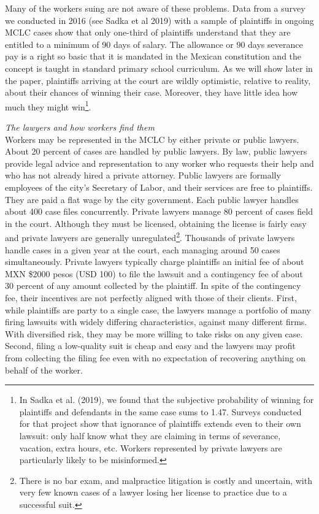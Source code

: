 \documentclass[12 pt]{article}
\begin{document}
Many of the workers suing are not aware of these problems. Data from a survey we conducted in 2016 (see Sadka et al 2019) with a sample of plaintiffs in ongoing MCLC cases show that only one-third of plaintiffs understand that they are entitled to a minimum of 90 days of salary. The allowance or 90 days severance pay is a right so basic that it is mandated in the Mexican constitution and the concept is taught in standard primary school curriculum. As we will show later in the paper, plaintiffs arriving at the court are wildly optimistic, relative to reality, about their chances of winning their case. Moreover, they have little idea how much they might win\footnote{In Sadka et al. (2019), we found that the subjective probability of winning for plaintiffs and defendants in the same case sums to 1.47. Surveys conducted for that project show that ignorance of plaintiffs extends even to their own lawsuit: only half know what they are claiming in terms of severance, vacation, extra hours, etc. Workers represented by private lawyers are particularly likely to be misinformed.}.

\emph{The lawyers and how workers find them}\\
Workers may be represented in the MCLC by either private or public lawyers. About 20 percent of cases are handled by public lawyers. By law, public lawyers provide legal advice and representation to any worker who requests their help and who has not already hired a private attorney. Public lawyers are formally employees of the city’s Secretary of Labor, and their services are free to plaintiffs. They are paid a flat wage by the city government. Each public lawyer handles about 400 case files concurrently. Private lawyers manage 80 percent of cases field in the court. Although they must be licensed, obtaining the license is fairly easy and private lawyers are generally unregulated\footnote{There is no bar exam, and malpractice litigation is costly and uncertain, with very few known cases of a lawyer losing her license to practice due to a successful suit.}.  Thousands of private lawyers handle cases in a given year at the court, each managing around 50 cases simultaneously. Private lawyers typically charge plaintiffs an initial fee of about MXN \$2000 pesos (USD 100) to file the lawsuit and a contingency fee of about 30 percent of any amount collected by the plaintiff. In spite of the contingency fee, their incentives are not perfectly aligned with those of their clients. First, while plaintiffs are party to a single case, the lawyers manage a portfolio of many firing lawsuits with widely differing characteristics, against many different firms. With diversified risk, they may be more willing to take risks on any given case. Second, filing a low-quality suit is cheap and easy and the lawyers may profit from collecting the filing fee even with no expectation of recovering anything on behalf of the worker. 
\end{document}
